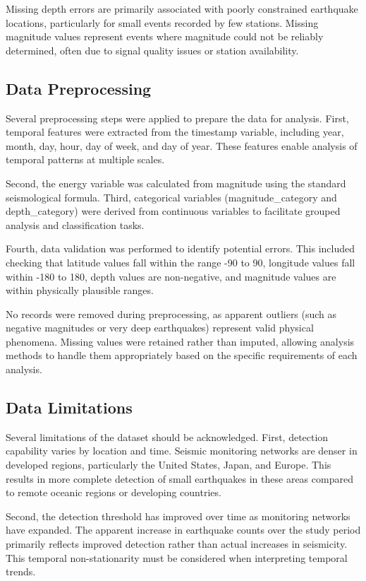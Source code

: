 Missing depth errors are primarily associated with poorly constrained earthquake locations, particularly for small events recorded by few stations. Missing magnitude values represent events where magnitude could not be reliably determined, often due to signal quality issues or station availability.

\subsection{Data Preprocessing}

Several preprocessing steps were applied to prepare the data for analysis. First, temporal features were extracted from the timestamp variable, including year, month, day, hour, day of week, and day of year. These features enable analysis of temporal patterns at multiple scales.

Second, the energy variable was calculated from magnitude using the standard seismological formula. Third, categorical variables (magnitude\_category and depth\_category) were derived from continuous variables to facilitate grouped analysis and classification tasks.

Fourth, data validation was performed to identify potential errors. This included checking that latitude values fall within the range -90 to 90, longitude values fall within -180 to 180, depth values are non-negative, and magnitude values are within physically plausible ranges.

No records were removed during preprocessing, as apparent outliers (such as negative magnitudes or very deep earthquakes) represent valid physical phenomena. Missing values were retained rather than imputed, allowing analysis methods to handle them appropriately based on the specific requirements of each analysis.

\subsection{Data Limitations}

Several limitations of the dataset should be acknowledged. First, detection capability varies by location and time. Seismic monitoring networks are denser in developed regions, particularly the United States, Japan, and Europe. This results in more complete detection of small earthquakes in these areas compared to remote oceanic regions or developing countries.

Second, the detection threshold has improved over time as monitoring networks have expanded. The apparent increase in earthquake counts over the study period primarily reflects improved detection rather than actual increases in seismicity. This temporal non-stationarity must be considered when interpreting temporal trends.

